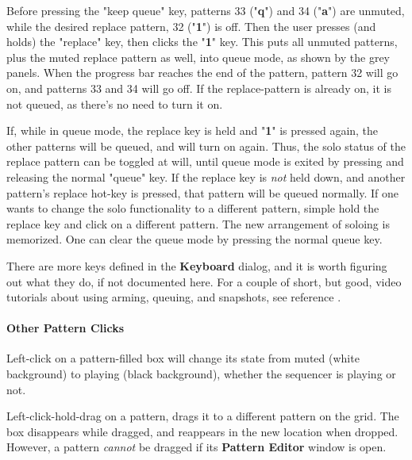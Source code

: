    Before pressing the "keep queue" key, patterns 33 ("\textbf{q}")
   and 34 ("\textbf{a}") are
   unmuted, while the desired replace pattern, 32 ("\textbf{1}") is off.
   Then the user presses (and holds) the "replace" key, then clicks the
   "\textbf{1}" key.
   This puts all unmuted patterns, plus the muted
   replace pattern as well, into queue mode, as shown by the grey panels.
   When the progress bar reaches the end of the pattern, pattern 32 will go on,
   and patterns 33 and 34 will go off.
   If the replace-pattern is already on, it is not queued, as
   there's no need to turn it on.

   If, while in queue mode, the replace key is held and
   "\textbf{1}" is pressed again,
   the other patterns will be queued, and will turn on again.  Thus, the
   solo status of the replace pattern can be toggled at will, until queue mode
   is exited by pressing and releasing the normal "queue" key.
   If the replace key is \textsl{not} held down, and another pattern's replace
   hot-key is pressed, that pattern will be queued normally.
   If one wants to change the solo functionality to a different pattern,
   simple hold the replace key and click on a different pattern.  The new
   arrangement of soloing is memorized.
   One can clear the queue mode by pressing the normal queue key.

   There are more keys defined in the \textbf{Keyboard} dialog, and it is
   worth figuring out what they do, if not documented here.
   For a couple of short, but good, video tutorials about using arming,
   queuing, and snapshots, see reference \cite{wootangent1}.

\paragraph{Other Pattern Clicks}
\label{paragraph:patterns_pattern_Clicks}

   Left-click on a pattern-filled box will change its state
   from muted (white background) to playing (black background), whether
   the sequencer is playing or not.

   Left-click-hold-drag on a pattern, drags it to a different
   pattern on the grid.
   The box disappears while dragged, and reappears in the new location when
   dropped.  However, a pattern \textsl{cannot} be dragged if its
   \textbf{Pattern Editor} window is open.

